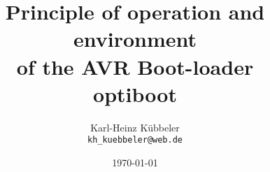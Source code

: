 \documentclass[pdftex,12pt,a4paper,oneside,english]{report}
\begin{document}
\title{Principle of operation and environment\\
of the AVR Boot-loader \\
 optiboot\\
}
\author{Karl-Heinz Kübbeler\\
\texttt{kh\_kuebbeler@web.de}}
\date{\today}

\maketitle
\tableofcontents










\end{document}
